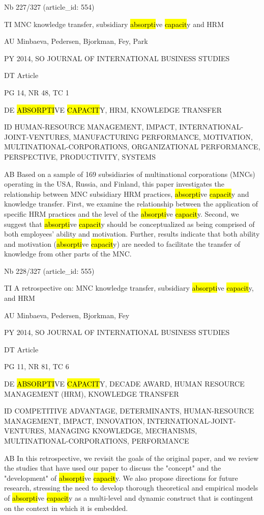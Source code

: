 \documentclass[a4paper]{article}
\begin{document}
\vspace*{-2cm}
Nb \tabto{0cm}227/327 (article\_id: 554)\par
TI \tabto{0cm}MNC knowledge transfer, subsidiary \hl{absorpti}ve \hl{capacit}y and HRM\par
AU \tabto{0cm}Minbaeva, Pedersen, Bjorkman, Fey, Park\par
PY \tabto{0cm}2014, SO JOURNAL OF INTERNATIONAL BUSINESS STUDIES\par
DT \tabto{0cm}Article\par
PG \tabto{0cm}14, NR 48, TC 1\par
DE \tabto{0cm}\hl{ABSORPTI}VE \hl{CAPACIT}Y, HRM, KNOWLEDGE TRANSFER\par
ID \tabto{0cm}HUMAN-RESOURCE MANAGEMENT, IMPACT, INTERNATIONAL-JOINT-VENTURES, MANUFACTURING PERFORMANCE, MOTIVATION, MULTINATIONAL-CORPORATIONS, ORGANIZATIONAL PERFORMANCE, PERSPECTIVE, PRODUCTIVITY, SYSTEMS\par
AB \tabto{0cm}Based on a sample of 169 subsidiaries of multinational corporations (MNCs) operating in the USA, Russia, and Finland, this paper investigates the relationship between MNC subsidiary HRM practices, \hl{absorpti}ve \hl{capacit}y and knowledge transfer. First, we examine the relationship between the application of specific HRM practices and the level of the \hl{absorpti}ve \hl{capacit}y. Second, we suggest that \hl{absorpti}ve \hl{capacit}y should be conceptualized as being comprised of both employees' ability and motivation. Further, results indicate that both ability and motivation (\hl{absorpti}ve \hl{capacit}y) are needed to facilitate the transfer of knowledge from other parts of the MNC.\par
\clearpage

\vspace*{-2cm}
Nb \tabto{0cm}228/327 (article\_id: 555)\par
TI \tabto{0cm}A retrospective on: MNC knowledge transfer, subsidiary \hl{absorpti}ve \hl{capacit}y, and HRM\par
AU \tabto{0cm}Minbaeva, Pedersen, Bjorkman, Fey\par
PY \tabto{0cm}2014, SO JOURNAL OF INTERNATIONAL BUSINESS STUDIES\par
DT \tabto{0cm}Article\par
PG \tabto{0cm}11, NR 81, TC 6\par
DE \tabto{0cm}\hl{ABSORPTI}VE \hl{CAPACIT}Y, DECADE AWARD, HUMAN RESOURCE MANAGEMENT (HRM), KNOWLEDGE TRANSFER\par
ID \tabto{0cm}COMPETITIVE ADVANTAGE, DETERMINANTS, HUMAN-RESOURCE MANAGEMENT, IMPACT, INNOVATION, INTERNATIONAL-JOINT-VENTURES, MANAGING KNOWLEDGE, MECHANISMS, MULTINATIONAL-CORPORATIONS, PERFORMANCE\par
AB \tabto{0cm}In this retrospective, we revisit the goals of the original paper, and we review the studies that have used our paper to discuss the "concept" and the "development" of \hl{absorpti}ve \hl{capacit}y. We also propose directions for future research, stressing the need to develop thorough theoretical and empirical models of \hl{absorpti}ve \hl{capacit}y as a multi-level and dynamic construct that is contingent on the context in which it is embedded.\par
\clearpage
\end{document}
